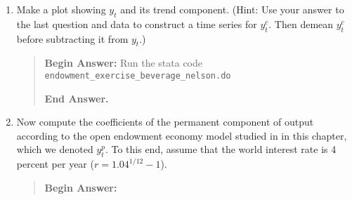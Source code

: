 \begin{exercise}
\begin{enumerate}
\begin{quote}
{\bf End Answer.}
\end{quote}

\item  Make a plot showing $y_t$ and its trend component. 
(Hint: Use your answer to the last question and data to construct a time series for $y^c_t$. Then   demean $y^c_t$  before subtracting it from $y_t$.) 

\begin{quote}
{\bf Begin Answer: }
Run the stata code \verb?endowment_exercise_beverage_nelson.do ?

{\bf End Answer.}
\end{quote}

\item Now  compute the  coefficients of the permanent component of output according to the open  endowment economy model studied in 
in this chapter, which we denoted $y^p_t$. To this end, assume that the world interest rate is 4 percent per year
 ($r= 1.04^{1/12}-1$). 
\begin{quote}
{\bf Begin Answer: }


\end{quote}
\end{enumerate}
\end{exercise}
